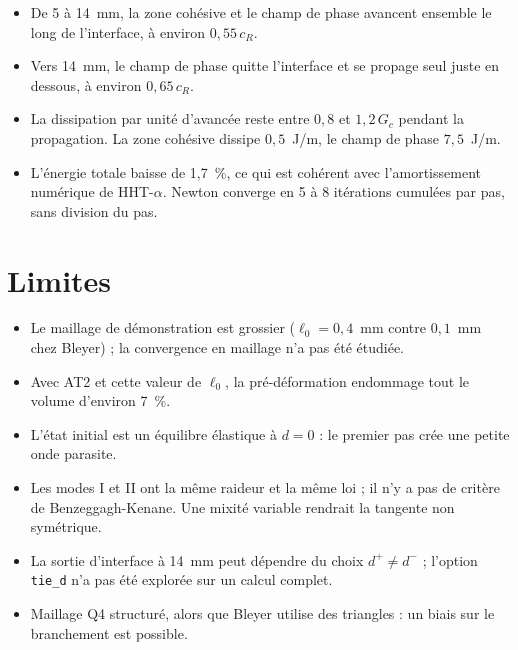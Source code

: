 \documentclass[11pt,a4paper]{article}
\begin{document}
\begin{itemize}
\item De 5 à 14~mm, la zone cohésive et le champ de phase avancent ensemble le long de l'interface, à
environ $0{,}55\,c_R$.
\item Vers 14~mm, le champ de phase quitte l'interface et se propage seul juste en dessous, à environ
$0{,}65\,c_R$.
\item La dissipation par unité d'avancée reste entre $0{,}8$ et $1{,}2\,G_c$ pendant la propagation. La
zone cohésive dissipe $0{,}5$~J/m, le champ de phase $7{,}5$~J/m.
\item L'énergie totale baisse de 1{,}7~\%, ce qui est cohérent avec l'amortissement numérique de HHT-$\alpha$.
Newton converge en 5 à 8 itérations cumulées par pas, sans division du pas.
\end{itemize}

\section{Limites}
\begin{itemize}
\item Le maillage de démonstration est grossier ($\ell_0=0{,}4$~mm contre $0{,}1$~mm chez Bleyer) ; la
convergence en maillage n'a pas été étudiée.
\item Avec AT2 et cette valeur de $\ell_0$, la pré-déformation endommage tout le volume d'environ 7~\%.
\item L'état initial est un équilibre élastique à $d=0$ : le premier pas crée une petite onde parasite.
\item Les modes I et II ont la même raideur et la même loi ; il n'y a pas de critère de Benzeggagh-Kenane.
Une mixité variable rendrait la tangente non symétrique.
\item La sortie d'interface à 14~mm peut dépendre du choix $d^+\neq d^-$ ; l'option \texttt{tie\_d} n'a pas
été explorée sur un calcul complet.
\item Maillage Q4 structuré, alors que Bleyer utilise des triangles : un biais sur le branchement est possible.
\end{itemize}
\end{document}
